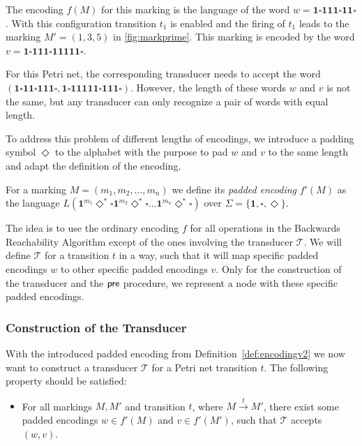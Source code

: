 The encoding $f(M)$ for this marking is the language of the word $w = \bm{1 \square 111 \square 11 \square}$. With this configuration transition $t_{1}$ is enabled and the firing of $t_{1}$ leads to the marking $M'=(1,3,5)$ in \autoref{fig:markprime}. This marking is encoded by the word $v = \bm{1 \square 111 \square 11111 \square}$. 

For this Petri net, the corresponding transducer needs to accept the word \break ${(\bm{1 \square 11 \square 111 \square},\bm{1 \square 11111 \square 111 \square})}$. However, the length of these words $w$ and $v$ is not the same, but any transducer can only recognize a pair of words with equal length. 

To address this problem of different lengths of encodings, we introduce a padding symbol $\Diamond$ to the alphabet with the purpose to pad $w$ and $v$ to the same length and adapt the definition of the encoding.

\begin{definition}\label{def:encodingv2}
For a marking $M = (m_{1},m_{2},\dots,m_{n})$ we define its \emph{padded encoding} $f'(M)$ as the language $L(\bm{1}^{m_{1}} \Diamond^{\bm{*}} \square \bm{1}^{m_{2}} \Diamond^{\bm{*}}  \square \ldots \bm{1}^{m_{n}} \Diamond^{\bm{*}}  \square)$ over $\Sigma = \{\bm{1}, \square, \Diamond \}$.
\end{definition}

The idea is to use the ordinary encoding $f$ for all operations in the Backwards Reachability Algorithm except of the ones involving the transducer $\mathcal{T}$. We will define $\mathcal{T}$ for a transition $t$ in a way, such that it will map specific padded encodings $w$ to other specific padded encodings $v$. Only for the construction of the transducer and the $\operatorname{\textsf{pre}}$ procedure, we represent a node with these specific padded encodings. 



 



\subsubsection{Construction of the Transducer}

With the introduced padded encoding from Definition~\autoref{def:encodingv2} we now want to construct a transducer $\mathcal{T}$ for a Petri net transition $t$. The following property should be satisfied:
\begin{itemize}[-,noitemsep]
\item For all markings $M,M'$ and transition $t$, where $M \xrightarrow{t} M'$, there exist some padded encodings $w \in f'(M)$ and $v \in f'(M')$, such that $\mathcal{T}$ accepts $(w,v)$.
\end{itemize}




